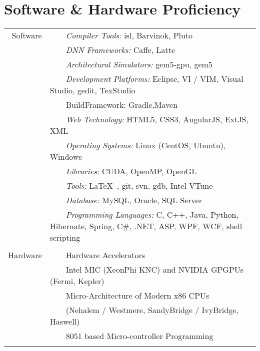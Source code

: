 \documentclass[a4paper,10pt]{article} %
\newcommand{\tabitem}{~~\llap{\textbullet}~~}
\begin{document}
\section{Software \& Hardware Proficiency}
\begin{tabular}{rl}
Software & \tabitem \textit{Compiler Tools:} isl, Barvinok, Pluto\\
& \tabitem \textit{DNN Frameworks:} Caffe, Latte\\
& \tabitem \textit{Architectural Simulators:} gem5-gpu, gem5\\
& \tabitem \textit{Development Platforms:} Eclipse, VI / VIM, Visual Studio, gedit, TexStudio\\
& \tabitem{BuildFramework:} Gradle,Maven \\
& \tabitem \textit{Web Technology:} HTML5, CSS3, AngularJS, ExtJS, XML\\
& \tabitem \textit{Operating Systems:} Linux (CentOS, Ubuntu), Windows \\
& \tabitem \textit{Libraries:} CUDA, OpenMP, OpenGL  \\
& \tabitem \textit{Tools:} \LaTeX\ , git, svn, gdb, Intel VTune\\
& \tabitem \textit{Database:} MySQL, Oracle, SQL Server\\
& \tabitem \textit{Programming Languages:} C, C++, Java, Python, Hibernate, Spring, C\#, .NET, ASP, WPF, WCF, shell scripting\\

&\\

Hardware  & \tabitem Hardware Accelerators \\
& ~~~~Intel MIC (XeonPhi KNC) and NVIDIA GPGPUs (Fermi, Kepler) \\
& \tabitem Micro-Architecture of Modern x86 CPUs\\
& ~~~~(Nehalem / Westmere, SandyBridge / IvyBridge, Haswell) \\ 
& \tabitem 8051 based Micro-controller Programming \\
&\\
\end{tabular}
\\
\\
\end{document}
